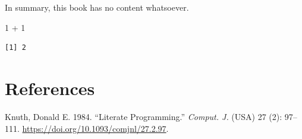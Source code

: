\documentclass[
  letterpaper,
  DIV=11,
  numbers=noendperiod]{scrreprt}
\newenvironment{Shaded}{\begin{snugshade}}{\end{snugshade}}
\newcommand{\DecValTok}[1]{\textcolor[rgb]{0.68,0.00,0.00}{#1}}
\newcommand{\SpecialCharTok}[1]{\textcolor[rgb]{0.37,0.37,0.37}{#1}}
\newlength{\cslhangindent}
\newenvironment{CSLReferences}[2] %
 {\begin{list}{}{%
  \setlength{\itemindent}{0pt}
  \setlength{\leftmargin}{0pt}
  \setlength{\parsep}{0pt}
  \ifodd #1
   \setlength{\leftmargin}{\cslhangindent}
   \setlength{\itemindent}{-1\cslhangindent}
  \fi
  \setlength{\itemsep}{#2\baselineskip}}}
 {\end{list}}
\begin{document}
In summary, this book has no content whatsoever.

\begin{Shaded}
\begin{Highlighting}[]
\DecValTok{1} \SpecialCharTok{+} \DecValTok{1}
\end{Highlighting}
\end{Shaded}

\begin{verbatim}
[1] 2
\end{verbatim}


\chapter*{References}\label{references}


\protect{}\label{refs}
\begin{CSLReferences}{1}{1}
Knuth, Donald E. 1984. {``Literate Programming.''} \emph{Comput. J.}
(USA) 27 (2): 97--111. \url{https://doi.org/10.1093/comjnl/27.2.97}.

\end{CSLReferences}
\end{document}
